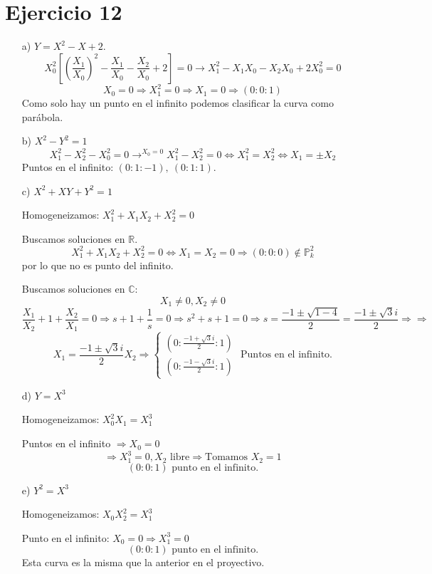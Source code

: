 \documentclass[10pt,a4paper,openright]{book}
\theoremstyle{break}
\begin{document}
\section{Ejercicio 12}%
\label{sec:ejercicio_12}
\begin{enumerate}
    \item[a)] $Y = X^2 - X + 2$.
    \[
    X_0^2\left[ \left( \frac{X_1}{X_0} \right)^2 - \frac{X_1}{X_0} - \frac{X_2}{X_0} + 2 \right] = 0 \rightarrow X_1^2 - X_1X_0 - X_2X_0 + 2X_0^2 = 0
    \]\[
    X_0 = 0 \Rightarrow X_1^2 = 0 \Rightarrow X_1 = 0 \Rightarrow \left( 0 : 0 : 1 \right) 
    \]
    Como solo hay un punto en el infinito podemos clasificar la curva como parábola.

    \item[b)] $X^2 - Y^2 = 1$
    \[
    X_1^2 - X_2^2 - X_0^2 = 0 \rightarrow^{X_0 = 0} X_1^2 - X_2^2 = 0 \Leftrightarrow X_1^2 = X_2^2 \Leftrightarrow X_1 = \pm X_2 
    \]
    Puntos en el infinito: $\left( 0 : 1 : -1 \right),\ \left( 0 : 1 : 1 \right)$.

    \item[c)] $X^2 + XY + Y^2 = 1$
    
    Homogeneizamos: $X_1^2 + X_1X_2 + X_2^2 = 0$

    Buscamos soluciones en $\mathbb{R}$.
    \[
    X_1^2 + X_1X_2 + X_2^2 = 0 \Leftrightarrow X_1 = X_2 = 0 \Rightarrow \left( 0 : 0 : 0 \right) \not\in \mathbb{P}^{2}_{k} 
    \]
    por lo que no es punto del infinito.

    Buscamos soluciones en $\mathbb{C}$: 
    \[
    X_1 \neq 0, X_2 \neq 0
    \]\[
    \frac{X_1}{X_2} + 1 + \frac{X_2}{X_1} = 0 \Rightarrow s + 1 + \frac{1}{s} = 0 \Rightarrow s^2 + s + 1 = 0 \Rightarrow s = \frac{-1 \pm \sqrt{1 - 4}}{2} = \frac{-1 \pm \sqrt{3}i}{2} \Rightarrow \Rightarrow
    \]\[
    X_1 = \frac{-1 \pm \sqrt{3}i}{2} X_2 \Rightarrow \begin{cases}
        \left( 0 : \frac{-1 + \sqrt{3}i}{2} : 1 \right) \\
        \left( 0 : \frac{-1 - \sqrt{3}i}{2} : 1 \right) 
    \end{cases} \text{ Puntos en el infinito.}  
    \]
    \item[d)] $Y = X^3$

    Homogeneizamos: $X_0^2X_1 = X_1^3$

    Puntos en el infinito $\Rightarrow X_0 = 0$
    \[
    \Rightarrow X_1^3 = 0, X_2 \text{ libre} \Rightarrow \text{Tomamos } X_2 = 1
    \]\[
    \left( 0 : 0 : 1 \right) \text{ punto en el infinito.}  
    \]
    \item[e)] $Y^2 = X^3$

    Homogeneizamos: $X_0X_2^2 = X_1^3$

    Punto en el infinito: $X_0 = 0 \Rightarrow X_1^3 = 0$
    \[
    \left( 0 : 0 : 1 \right) \text{ punto en el infinito.} 
    \]
    Esta curva es la misma que la anterior en el proyectivo.
\end{enumerate}
\end{document}
